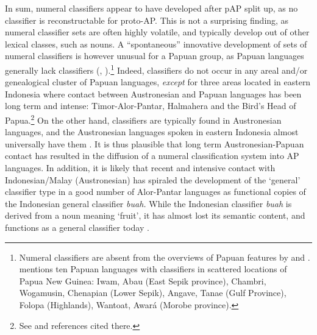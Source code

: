 In sum, numeral classifiers appear to have developed after pAP split up, as no classifier is reconstructable for proto-AP. This is not a surprising finding, as numeral classifier sets are often highly volatile, and typically develop out of other lexical classes, such as nouns. A ``spontaneous'' innovative development of sets of numeral classifiers is however unusual for a Papuan group, as Papuan languages generally lack classifiers (\citealt[123]{Aikhenvald2000}, \citealt{Klamer2014history}).\footnote{Numeral classifiers are absent from the overviews of Papuan features by \citet{Foley1986,Foley2000} and \citet{AikhenvaldEtAl2007}. \citet[123]{Aikhenvald2000}  mentions ten Papuan languages with classifiers in scattered locations of Papua New Guinea: Iwam, Abau (East Sepik province), Chambri, Wogamusin, Chenapian (Lower Sepik), Angave, Tanae (Gulf Province), Folopa (Highlands), Wantoat, Awar\'a (Morobe province).} Indeed, classifiers do not occur in any areal and/or genealogical cluster of Papuan languages, \textit{except} for three areas located in eastern Indonesia where contact between Austronesian and Papuan languages has been long term and intense: Timor-Alor-Pantar, Halmahera and the Bird's Head of Papua.\footnote{See \citet{Holtontanumeral,Klamertanumeral,Klamer2014history} and references cited there.} On the other hand, classifiers are typically found in Austronesian languages, and the Austronesian languages spoken in eastern Indonesia almost universally have them \citep{Klamertanumeral,Klamer2014history}. It is thus plausible that long term Austronesian-Papuan contact has resulted in the diffusion of a numeral classification system into AP languages. In addition, it is likely that recent and intensive contact with Indonesian/Malay (Austronesian) has spiraled the development of the `general' classifier type in a good number of Alor-Pantar languages as functional copies of the Indonesian general classifier \textit{buah.} While the Indonesian classifier \textit{buah} is derived from a noun meaning `fruit', it has almost lost its semantic content, and functions as a general classifier today \citep{Hopper1986,Chung2010}. 

